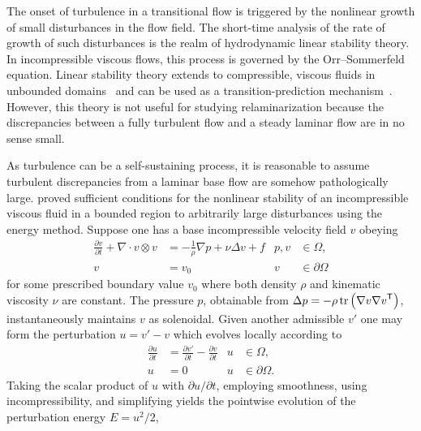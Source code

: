 The onset of turbulence in a transitional flow is triggered by the nonlinear
growth of small disturbances in the flow field.  The short-time analysis of
the rate of growth of such disturbances is the realm of hydrodynamic linear
stability theory.  In incompressible viscous flows, this process is governed
by the Orr--Sommerfeld equation.  Linear stability theory extends
to compressible, viscous fluids in unbounded domains~\citep{Mack1984Boundary}
and can be used as a transition-prediction mechanism~\citep{Reed1996Linear}.
However, this theory is not useful for studying relaminarization because the
discrepancies between a fully turbulent flow and a steady laminar flow are in
no sense small.

As turbulence can be a self-sustaining process, it is reasonable to assume
turbulent discrepancies from a laminar base flow are somehow pathologically
large.  \citet{Serrin1959Stability}
proved sufficient conditions for the nonlinear stability of an incompressible
viscous fluid in a bounded region to arbitrarily large disturbances using the
energy method.  Suppose one has a base incompressible velocity field
$v$ obeying
\begin{subequations}
\label{eq:serrin_model}
\begin{align}
    \frac{\partial\!v}{\partial\!t} + \nabla\cdot{}v\otimes{}v
&=
  - \frac{1}{\rho} \nabla{} p
  + \nu \Delta{}v
  + f
&
  p, v &\in \Omega
  ,
\\
  v &= v_0
&
  v &\in \partial\!\Omega
\end{align}
\end{subequations}
for some prescribed boundary value $v_0$ where both density $\rho$ and kinematic
viscosity $\nu$ are constant.  The pressure $p$, obtainable from $\Delta{}p = -
\rho \operatorname{tr} \left(\nabla{}v {\nabla{}v}^{\mathsf{T}}\right)$, instantaneously
maintains $v$ as solenoidal.  Given another admissible $v'$ one may form the
perturbation $u = v' - v$ which evolves locally according to
\begin{subequations}
\begin{align}
  \frac{\partial\!u}{\partial\!t}
&=
  \frac{\partial\!v'}{\partial\!t}
  -
  \frac{\partial\!v}{\partial\!t}
&
  u &\in \Omega
  ,
\\
  u &= 0
&
  u &\in \partial\!\Omega.
\end{align}
\end{subequations}
Taking the scalar product of $u$ with $\partial{}u/\partial{}t$,
employing smoothness, using incompressibility, and simplifying yields the
pointwise evolution of the perturbation energy $E = u^2/2$,
